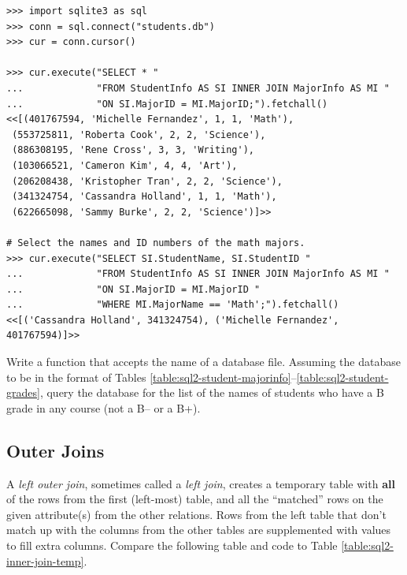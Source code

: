 \begin{lstlisting}
>>> import sqlite3 as sql
>>> conn = sql.connect("students.db")
>>> cur = conn.cursor()

>>> cur.execute("SELECT * "
...             "FROM StudentInfo AS SI INNER JOIN MajorInfo AS MI "
...             "ON SI.MajorID = MI.MajorID;").fetchall()
<<[(401767594, 'Michelle Fernandez', 1, 1, 'Math'),
 (553725811, 'Roberta Cook', 2, 2, 'Science'),
 (886308195, 'Rene Cross', 3, 3, 'Writing'),
 (103066521, 'Cameron Kim', 4, 4, 'Art'),
 (206208438, 'Kristopher Tran', 2, 2, 'Science'),
 (341324754, 'Cassandra Holland', 1, 1, 'Math'),
 (622665098, 'Sammy Burke', 2, 2, 'Science')]>>

# Select the names and ID numbers of the math majors.
>>> cur.execute("SELECT SI.StudentName, SI.StudentID "
...             "FROM StudentInfo AS SI INNER JOIN MajorInfo AS MI "
...             "ON SI.MajorID = MI.MajorID "
...             "WHERE MI.MajorName == 'Math';").fetchall()
<<[('Cassandra Holland', 341324754), ('Michelle Fernandez', 401767594)]>>
\end{lstlisting}

\begin{problem} %
Write a function that accepts the name of a database file.
Assuming the database to be in the format of Tables \ref{table:sql2-student-majorinfo}--\ref{table:sql2-student-grades}, query the database for the list of the names of students who have a B grade in any course (not a B-- or a B+).
\end{problem}

\subsection*{Outer Joins} %

A \emph{left outer join}, sometimes called a \emph{left join}, creates a temporary table with \textbf{all} of the rows from the first (left-most) table, and all the ``matched'' rows on the given attribute(s) from the other relations.
Rows from the left table that don't match up with the columns from the other tables are supplemented with  values to fill extra columns.
Compare the following table and code to Table \ref{table:sql2-inner-join-temp}.

